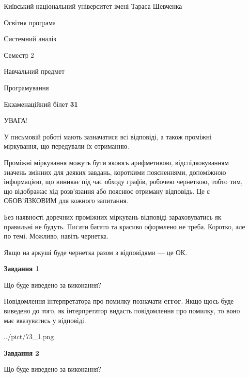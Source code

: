 \documentclass[12pt, ukrainian]{article}
\begin{document}
{{\begin {small}\par
{ \center  Київський національний університет імені Тараса Шевченка \par}
{\parbox {5 cm}{Освітня програма \hfill}{\parbox {7 cm}{Системний аналіз \hfill}}\parbox {6 cm}{\hfill Семестр 2}}\par
{\parbox {5 cm} {Навчальний предмет \hfill}\parbox {7 cm}{Програмування \hfill}\parbox {6cm}{\hfill}\par}\vspace{-7pt} \end{small}}{\center Екзаменаційний білет \No \textbf
{ 31 }\par}}
{
\begin {large}
УВАГА!

У письмовій роботі мають зазначатися всі відповіді, а також проміжні міркування, що передували їх отриманню.

Проміжні міркування можуть бути якоюсь арифметикою, відслідковуванням зна\-чень змінних для деяких завдань,
короткими поясненнями, допоміжною інформацією, що виникає під час обходу графів, робочею чернеткою,
тобто тим, що відображає хід розв’язання або пояснює отриману відповідь.
Це є ОБОВ’ЯЗКОВИМ для кожного запитання.

Без наявності доречних проміжних міркувань відповіді зараховуватись як правиль\-ні не будуть.
Писати багато та красиво оформлено не треба. Коротко, але по темі. Можли\-во, навіть чернетка.

Якщо на аркуші буде чернетка разом з відповідями --- це ОК.

\newpage

{\begin {center}\textbf{Завдання 1}\end {center}}\par
Що буде виведено за виконання?

Повідомлення інтерпретатора про помилку позначати \textbf{error}.
Якщо щось буде виведено до того, як інтерпретатор видасть повідомлення про помилку, 
то воно має вказуватись у відповіді. \par


\begin{center}
	{../pict/73_1.png}
\end{center}
\newpage

{\begin {center}\textbf{Завдання 2}\end {center}}\par
Що буде виведено за виконання?


\end{large}}
\end{document}
